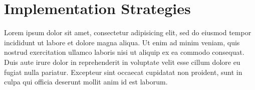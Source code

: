 \documentclass[11pt]{article}
\begin{document}
\section{Implementation Strategies}

Lorem ipsum dolor sit amet, consectetur adipisicing elit, sed do eiusmod tempor
incididunt ut labore et dolore magna aliqua. Ut enim ad minim veniam, quis
nostrud exercitation ullamco laboris nisi ut aliquip ex ea commodo consequat.
Duis aute irure dolor in reprehenderit in voluptate velit esse cillum dolore eu
fugiat nulla pariatur. Excepteur sint occaecat cupidatat non proident, sunt in
culpa qui officia deserunt mollit anim id est laborum.
\end{document}
